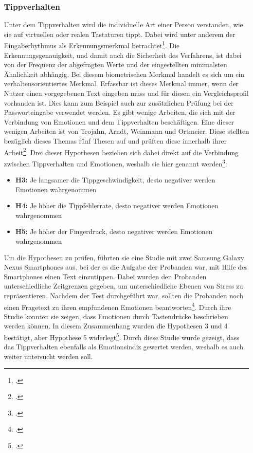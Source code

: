 \subsubsection{Tippverhalten}
Unter dem Tippverhalten wird die individuelle Art einer Person verstanden, wie sie auf virtuellen oder realen Tastaturen tippt. Dabei wird unter anderem der Eingaberhythmus als Erkennungsmerkmal betrachtet\footcite[Vgl. ][Allgemein Abs. 1]{Bio18b}. Die Erkennungsgenauigkeit, und damit auch die Sicherheit des Verfahrens, ist dabei von der Frequenz der abgefragten Werte und der eingestellten minimalsten Ähnlichkeit abhängig. Bei diesem biometrischen Merkmal handelt es sich um ein verhaltensorientiertes Merkmal. Erfassbar ist dieses Merkmal immer, wenn der Nutzer einen vorgegebenen Text eingeben muss und für diesen ein Vergleichsprofil vorhanden ist. Dies kann zum Beispiel auch zur zusätzlichen Prüfung bei der Passworteingabe verwendet werden.\newline
Es gibt wenige Arbeiten, die sich mit der Verbindung von Emotionen und dem Tippverhalten beschäftigen. Eine dieser wenigen Arbeiten ist von Trojahn, Arndt, Weinmann und Ortmeier. Diese stellten bezüglich dieses Themas fünf Thesen auf und prüften diese innerhalb ihrer Arbeit\footcite[Vgl. ][S.32 2.3 Hypotheses]{Tro13}. Drei dieser Hypothesen beziehen sich dabei direkt auf die Verbindung zwischen Tippverhalten und Emotionen, weshalb sie hier genannt werden\footcite[siehe ][S.33 Z.8-13 Übersetzung]{Tro13}:
\begin{itemize}
	\item \textbf{H3:} Je langsamer die Tippgeschwindigkeit, desto negativer werden Emotionen wahrgenommen
	\item \textbf{H4:} Je höher die Tippfehlerrate, desto negativer werden Emotionen wahrgenommen
	\item \textbf{H5:} Je höher der Fingerdruck, desto negativer werden Emotionen wahrgenommen
\end{itemize}
Um die Hypothesen zu prüfen, führten sie eine Studie mit zwei Samsung Galaxy Nexus Smartphones aus, bei der es die Aufgabe der Probanden war, mit Hilfe des Smartphones einen Text einzutippen. Dabei wurden den Probanden unterschiedliche Zeitgrenzen gegeben, um unterschiedliche Ebenen von Stress zu repräsentieren. Nachdem der Test durchgeführt war, sollten die Probanden noch einen Fragetext zu ihren empfundenen Emotionen beantworten\footcite[Vgl. ][S.33 3.1 Study Object and Study Task]{Tro13}. Durch ihre Studie konnten sie zeigen, dass Emotionen durch Tastendrücke beschrieben werden können. In diesem Zusammenhang wurden die Hypothesen 3 und 4 bestätigt, aber Hypothese 5 widerlegt\footcite[Vgl. ][S.35 5.1 Summary]{Tro13}.\newline
Durch diese Studie wurde gezeigt, dass das Tippverhalten ebenfalls als Emotionsindiz gewertet werden, weshalb es auch weiter untersucht werden soll.
